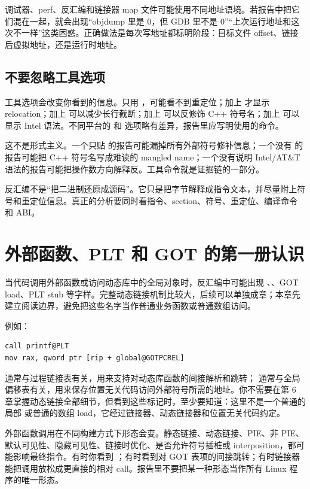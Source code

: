 调试器、perf、反汇编和链接器 map 文件可能使用不同地址语境。若报告中把它们混在一起，就会出现“objdump 里是 0，但 GDB 里不是 0”“上次运行地址和这次不一样”这类困惑。正确做法是每次写地址都标明阶段：目标文件 offset、链接后虚拟地址，还是运行时地址。

\subsection{不要忽略工具选项}

工具选项会改变你看到的信息。只用 ，可能看不到重定位；加上  才显示 relocation；加上  可以减少长行截断；加上  可以反修饰 C++ 符号名；加上  可以显示 Intel 语法。不同平台的  和  选项略有差异，报告里应写明使用的命令。

这不是形式主义。一个只贴  的报告可能漏掉所有外部符号修补信息；一个没有  的报告可能把 C++ 符号名写成难读的 mangled name；一个没有说明 Intel/AT\&T 语法的报告可能把操作数方向解释反。工具命令就是证据链的一部分。

\begin{keyidea}
反汇编不是“把二进制还原成源码”。它只是把字节解释成指令文本，并尽量附上符号和重定位信息。真正的分析要同时看指令、section、符号、重定位、编译命令和 ABI。
\end{keyidea}

\section{外部函数、PLT 和 GOT 的第一册认识}

当代码调用外部函数或访问动态库中的全局对象时，反汇编中可能出现 、、GOT load、PLT stub 等字样。完整动态链接机制比较大，后续可以单独成章；本章先建立阅读边界，避免把这些名字当作普通业务函数或普通数组访问。

例如：

\begin{lstlisting}
call printf@PLT
mov rax, qword ptr [rip + global@GOTPCREL]
\end{lstlisting}

 通常与过程链接表有关，用来支持对动态库函数的间接解析和跳转； 通常与全局偏移表有关，用来保存位置无关代码访问外部符号所需的地址。你不需要在第 6 章掌握动态链接全部细节，但看到这些标记时，至少要知道：这里不是一个普通的局部  或普通的数组 load，它经过链接器、动态链接器和位置无关代码约定。

外部函数调用在不同构建方式下形态会变。静态链接、动态链接、PIE、非 PIE、默认可见性、隐藏可见性、链接时优化、是否允许符号插桩或 interposition，都可能影响最终指令。有时你看到 ；有时看到对 GOT 表项的间接跳转；有时链接器能把调用放松成更直接的相对 call。报告里不要把某一种形态当作所有 Linux 程序的唯一形态。

